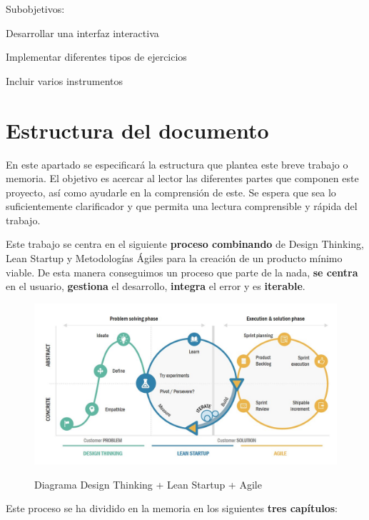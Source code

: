 \documentclass[12pt,twoside,titlepage]{report}
\begin{document}
Subobjetivos:
\begin{compactitem}
    \item Desarrollar una interfaz interactiva
    \item Implementar diferentes tipos de ejercicios 
    \item Incluir varios instrumentos
\end{compactitem}

\section{Estructura del documento}

En este apartado se especificará la estructura que plantea este breve trabajo o memoria. El objetivo es acercar al lector las diferentes partes que componen este proyecto, así como ayudarle en la comprensión de este. Se espera que sea lo suficientemente clarificador y que permita una lectura comprensible y rápida del trabajo.

Este trabajo se centra en el siguiente \textbf{proceso combinando} de Design Thinking, Lean Startup y Metodologías Ágiles para la creación de un producto mínimo viable. De esta manera conseguimos un proceso que parte de la nada, \textbf{se centra} en el usuario, \textbf{gestiona} el desarrollo, \textbf{integra} el error y es \textbf{iterable}.

\begin{figure}[H] 
    \includegraphics[scale=0.45]{LeanDesignAgile}
    \centering
    \label{fig:Lean Design Agile}
    \caption{Diagrama Design Thinking + Lean Startup + Agile}
\end{figure}

Este proceso se ha dividido en la memoria en los siguientes \textbf{tres capítulos}:
\end{document}
